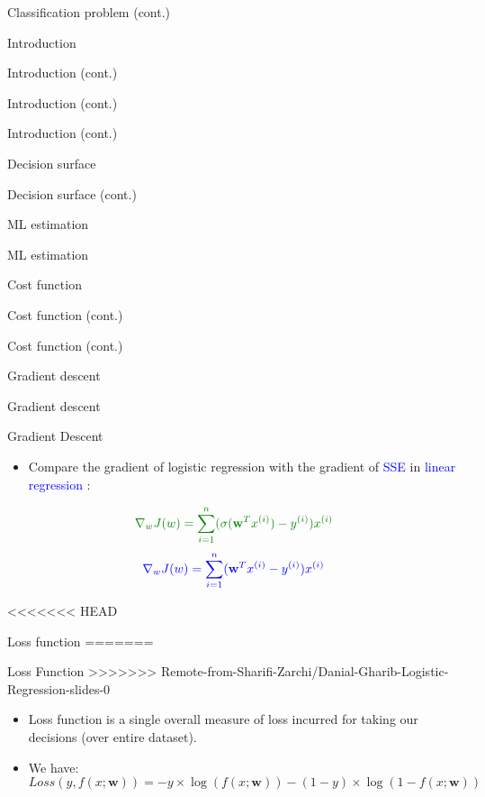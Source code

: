 \documentclass[serif, aspectratio=169]{beamer}
\begin{document}
\begin{frame}{Classification problem (cont.)}
\begin{itemize}
\begin{frame}{Introduction}
\begin{itemize}
\begin{frame}{Introduction (cont.)}
\begin{frame}{Introduction (cont.)}
\begin{frame}{Introduction (cont.)}
\begin{frame}{Decision surface}
\begin{itemize}
\begin{frame}{Decision surface (cont.)}
\begin{frame}{ML estimation}
\begin{frame}{ML estimation}
\begin{itemize}
\begin{frame}{Cost function}
\begin{frame}{Cost function (cont.)}
\begin{itemize}
\begin{itemize}
\begin{frame}{Cost function (cont.)}
\begin{frame}{Gradient descent}
\begin{frame}{Gradient descent}
\begin{frame}{Gradient Descent}
\begin{itemize}
    \item Compare the gradient of \textcolor{deepgreen}{logistic regression} with the gradient of \textcolor{blue}{SSE} in \textcolor{blue}{linear regression} :
    \end{itemize}
        \begin{align*}
        \color{deepgreen}
             \nabla _w J(w) = \sum_{i=1}^{n} (\sigma (\mathbf{w}^Tx^{(i)}) - y^{(i)})x^{(i)} 
        \end{align*}
        \begin{align*}
            \color{blue}
            \nabla _w J(w) = \sum_{i=1}^{n} (\mathbf{w}^Tx^{(i)} - y^{(i)})x^{(i)}
        \end{align*}
        
\end{frame}


<<<<<<< HEAD
\begin{frame}{Loss function}
=======
\begin{frame}{Loss Function}
>>>>>>> Remote-from-Sharifi-Zarchi/Danial-Gharib-Logistic-Regression-slides-0
    \begin{itemize}
        \item Loss function is a single overall measure of loss incurred for taking our decisions (over entire dataset).
        \item We have:
        \[ Loss(y, f(x; \mathbf{w})) = -y \times \log (f(x; \mathbf{w})) - (1-y) \times \log 
        (1 - f(x; \mathbf{w}))
        \]
        

\end{itemize}
\end{frame}
\end{frame}
\end{frame}
\end{frame}
\end{frame}
\end{itemize}
\end{itemize}
\end{frame}
\end{frame}
\end{itemize}
\end{frame}
\end{frame}
\end{frame}
\end{itemize}
\end{frame}
\end{frame}
\end{frame}
\end{frame}
\end{itemize}
\end{frame}
\end{itemize}
\end{frame}
\end{document}
